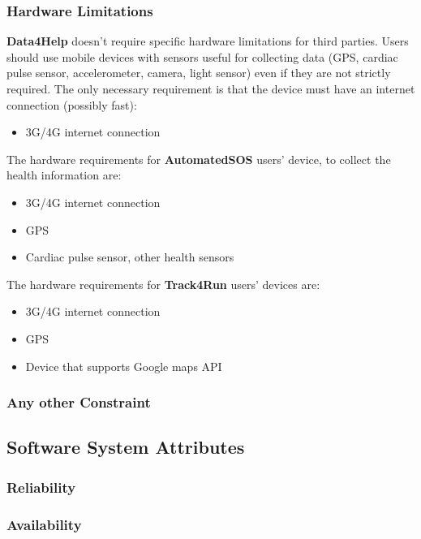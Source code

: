 \documentclass[a4paper]{article}
\begin{document}
    \subsubsection{Hardware Limitations}
 \textbf{Data4Help} doesn't require specific hardware limitations for third parties. Users should use mobile devices with sensors useful for collecting data (GPS, cardiac pulse sensor, accelerometer, camera, light sensor) even if they are not strictly required. The only necessary requirement is that the device must have an internet connection (possibly fast):
    \begin{itemize}
        \item 3G/4G internet connection
    \end{itemize}
    
\noindent The hardware requirements for \textbf{AutomatedSOS} users' device, to collect the health information are:
    \begin{itemize}
        \item 3G/4G internet connection
        \item GPS
        \item Cardiac pulse sensor, other health sensors
    \end{itemize}
\noindent The hardware requirements for \textbf{Track4Run} users' devices are:
    \begin{itemize}
        \item 3G/4G internet connection
        \item GPS
        \item Device that supports Google maps API
    \end{itemize}
    
    \subsubsection{Any other Constraint}
    
    
    
    \subsection{Software System Attributes}
    
    \subsubsection{Reliability}
    
    \subsubsection{Availability}
    
\end{document}
